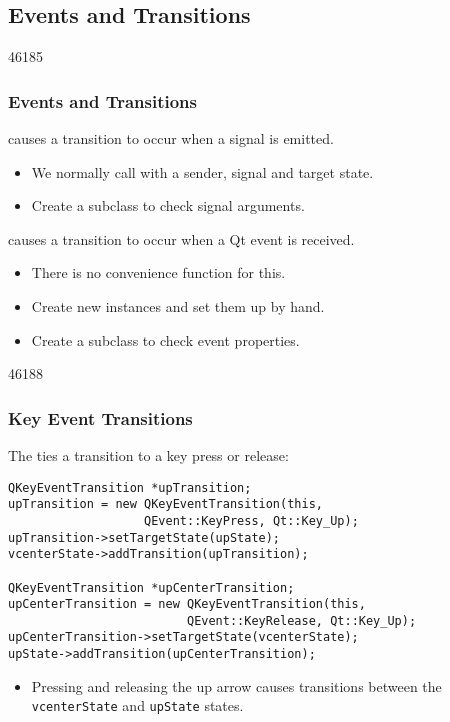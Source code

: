 \subsection{Events and Transitions}

\begin{slide}{46185}\frametitle{Events and Transitions}
\label{Animation-States-Events}
 causes a transition to occur when a signal
is emitted.

\begin{itemize}
\item We normally call  with
a sender, signal and target state.
\item Create a subclass to check signal arguments.
\end{itemize}

 causes a transition to occur when a Qt event
is received.

\begin{itemize}
\item There is no convenience function for this.
\item Create new instances and set them up by hand.
\item Create a subclass to check event properties.
\end{itemize}
\end{slide}


\begin{slide}[fragile]{46188}\frametitle{Key Event Transitions}
The  ties a transition to a key press or release:

\vspace*{0.5em}
\small
\begin{lstlisting}
QKeyEventTransition *upTransition;
upTransition = new QKeyEventTransition(this,
                   QEvent::KeyPress, Qt::Key_Up);
upTransition->setTargetState(upState);
vcenterState->addTransition(upTransition);

QKeyEventTransition *upCenterTransition;
upCenterTransition = new QKeyEventTransition(this,
                         QEvent::KeyRelease, Qt::Key_Up);
upCenterTransition->setTargetState(vcenterState);
upState->addTransition(upCenterTransition);
\end{lstlisting}
\normalsize

\begin{itemize}
\item Pressing and releasing the up arrow causes transitions between the \texttt{vcenterState}
and \texttt{upState} states.
\end{itemize}
\end{slide}


